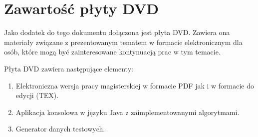 \chapter{Zawartość płyty DVD}

Jako dodatek do tego dokumentu dołączona jest płyta DVD. Zawiera ona materiały związane z prezentowanym tematem w formacie elektronicznym dla osób, które mogą być zainteresowane kontynuacją prac w tym temacie. 

Płyta DVD zawiera następujące elementy:

\begin{enumerate}
\item Elektroniczna wersja pracy magisterskiej w formacie PDF jak i w formacie do edycji (TEX).
\item Aplikacja konsolowa w języku Java z zaimplementowanymi algorytmami.
\item Generator danych testowych.
\end{enumerate}

